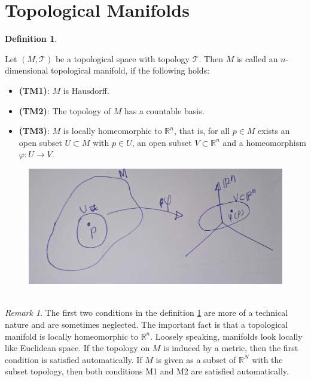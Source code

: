 \documentclass[
]{book}
\providecommand{\tightlist}{%
  \setlength{\itemsep}{0pt}\setlength{\parskip}{0pt}}
\theoremstyle{definition}
\newtheorem{definition}{Definition}[chapter]
\theoremstyle{definition}
\theoremstyle{definition}
\theoremstyle{definition}
\theoremstyle{remark}
\newtheorem*{remark}{Remark}
\begin{document}
\hypertarget{topological-manifolds}{%
\section{Topological Manifolds}\label{topological-manifolds}}

\begin{definition}
\protect\hypertarget{def:topmanifold}{}\label{def:topmanifold}

Let \((M,\mathcal{T})\) be a topological space with topology \(\mathcal{T}\). Then \(M\) is called an \(n\)-dimensional topological manifold, if the following holds:

\begin{itemize}
\tightlist
\item
  \textbf{(TM1)}: \(M\) is Hausdorff.
\item
  \textbf{(TM2)}: The topology of \(M\) has a countable basis.
\item
  \textbf{(TM3)}: \(M\) is locally homeomorphic to \(\mathbb{R}^n\), that is, for all \(p \in M\) exists an open subset \(U \subset M\) with \(p \in U\), an open subset \(V \subset \mathbb{R}^n\) and a homeomorphism \(\varphi : U \rightarrow V\).
\end{itemize}

\end{definition}

\begin{figure}
\centering
\includegraphics{figures/ch1/fig02.jpg}
\caption{\label{fig:fig02}\(~\)}
\end{figure}

\begin{remark}
The first two conditions in the definition \ref{def:topmanifold} are more of a technical nature and are sometimes neglected. The important fact is that a topological manifold is locally homeomorphic to \(\mathbb{R}^n\). Loosely speaking, manifolds look locally like Euclidean space. If the topology on \(M\) is induced by a metric, then the first condition is satisfied automatically. If \(M\) is given as a subset of \(\mathbb{R}^N\) with the subset topology, then both conditions M1 and M2 are satisfied automatically.
\end{remark}
\end{document}
